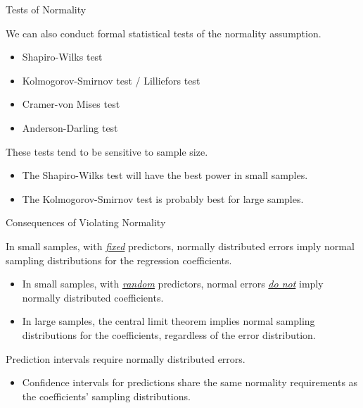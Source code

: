 \documentclass{beamer}\usepackage[]{graphicx}\usepackage[]{color}
\begin{document}
\begin{frame}{Tests of Normality}
  
  We can also conduct formal statistical tests of the normality assumption.
  
  \begin{itemize}
  \item Shapiro-Wilks test
  \item Kolmogorov-Smirnov test / Lilliefors test
  \item Cramer-von Mises test
  \item Anderson-Darling test
  \end{itemize}
  
  \va
  
  These tests tend to be sensitive to sample size.
  \begin{itemize}
  \item The Shapiro-Wilks test will have the best power in small samples.
  \item The Kolmogorov-Smirnov test is probably best for large samples.
  \end{itemize}
  
\end{frame}


\begin{frame}{Consequences of Violating Normality}

  In small samples, with \emph{\underline{fixed}} predictors, normally
  distributed errors imply normal sampling distributions for the regression
  coefficients.  
  \vc
  \begin{itemize}
  \item In small samples, with \emph{\underline{random}} predictors, normal
    errors \emph{\underline{do not}} imply normally distributed coefficients.
    \vc
  \item In large samples, the central limit theorem implies normal sampling
    distributions for the coefficients, regardless of the error distribution.
  \end{itemize}
  \va
  \pause
  Prediction intervals require normally distributed errors.
  \vc
  \begin{itemize}
  \item Confidence intervals for predictions share the same normality
    requirements as the coefficients' sampling distributions.
  \end{itemize}
  
\end{frame}
\end{document}
